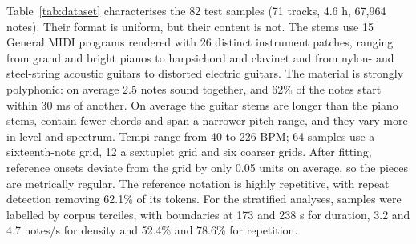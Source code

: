 \documentclass[conference]{IEEEtran}
\begin{document}
Table~\ref{tab:dataset} characterises the 82 test samples (71 tracks, 4.6 h, 67,964 notes). Their format is uniform, but their content is not. The stems use 15 General MIDI programs rendered with 26 distinct instrument patches, ranging from grand and bright pianos to harpsichord and clavinet and from nylon- and steel-string acoustic guitars to distorted electric guitars. The material is strongly polyphonic: on average 2.5 notes sound together, and 62\% of the notes start within 30 ms of another. On average the guitar stems are longer than the piano stems, contain fewer chords and span a narrower pitch range, and they vary more in level and spectrum. Tempi range from 40 to 226 BPM; 64 samples use a sixteenth-note grid, 12 a sextuplet grid and six coarser grids. After fitting, reference onsets deviate from the grid by only 0.05 units on average, so the pieces are metrically regular. The reference notation is highly repetitive, with repeat detection removing 62.1\% of its tokens. For the stratified analyses, samples were labelled by corpus terciles, with boundaries at 173 and 238 s for duration, 3.2 and 4.7 notes/s for density and 52.4\% and 78.6\% for repetition.
\end{document}
